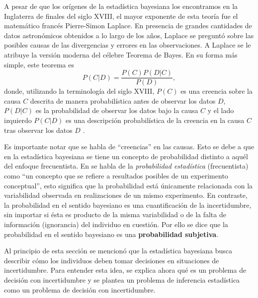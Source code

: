 \documentclass[11pt,a4paper]{article}
\begin{document}
A pesar de que los orígenes de la estadística bayesiana los encontramos en la Inglaterra de finales del siglo XVIII, el mayor exponente de esta teoría fue el matemático francés Pierre-Simon Laplace. En presencia de grandes cantidades de datos astronómicos obtenidos a lo largo de los años, Laplace se preguntó sobre las posibles causas de las divergencias y errores en las observaciones. A Laplace se le atribuye la versión moderna del célebre Teorema de Bayes. En su forma más simple, este teorema es
\begin{equation}
\label{bayes}
P(C|D) = \frac{P(C)P(D|C)}{P(D)},
\end{equation}
donde, utilizando la terminología del siglo XVIII, $P(C)$ es una creencia sobre la causa $C$ descrita de manera probabilística antes de observar los datos $D$, $P(D|C)$ es la probabilidad de observar los datos bajo la causa $C$ y el lado izquierdo $P(C|D)$ es una descripción probabilística de la creencia en la causa $C$ tras observar los datos $D$ \citep{bernardo}.

Es importante notar que se habla de ``creencias'' en las causas. Esto se debe a que en la estadística bayesiana se tiene un concepto de probabilidad distinto a aquél del enfoque frecuentista. En \citet{feller} se habla de la \textit{probabilidad estadística} (frecuentista) como ``un concepto que se refiere a resultados posibles de un experimento conceptual'', esto significa que la probabilidad está únicamente relacionada con la variabilidad observada en realizaciones de un mismo experimento. En contraste, la probabilidad en el sentido bayesiano es una cuantificación de la incertidumbre, sin importar si ésta es producto de la misma variabilidad o de la falta de información (ignorancia) del individuo en cuestión. Por ello se dice que la probabilidad en el sentido bayesiano es una \textbf{probabilidad subjetiva}.

Al principio de esta sección se mencionó que la estadística bayesiana busca describir cómo los individuos deben tomar decisiones en situaciones de incertidumbre. Para entender esta idea, se explica ahora qué es un problema de decisión con incertidumbre y se plantea un problema de inferencia estadística como un problema de decisión con incertidumbre.
\end{document}
